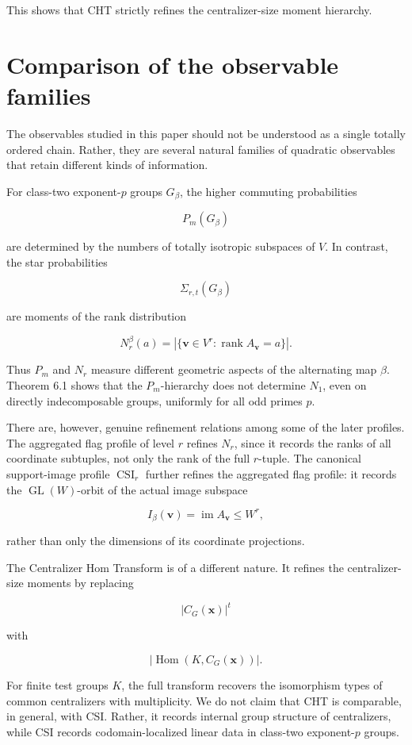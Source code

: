 \documentclass[11pt]{article}
\begin{document}
This shows that CHT strictly refines the centralizer-size moment hierarchy.

\section{Comparison of the observable families}

The observables studied in this paper should not be understood as a single totally ordered chain. Rather, they are several natural families of quadratic observables that retain different kinds of information.

For class-two exponent-$p$ groups $G_\beta$, the higher commuting probabilities

\[
P_m(G_\beta)
\]

are determined by the numbers of totally isotropic subspaces of $V$. In contrast, the star probabilities

\[
\Sigma_{r,t}(G_\beta)
\]

are moments of the rank distribution

\[
N_r^\beta(a)
=
|\{\mathbf v\in V^r:\operatorname{rank}A_{\mathbf v}=a\}|.
\]

Thus $P_m$ and $N_r$ measure different geometric aspects of the alternating map $\beta$. Theorem 6.1 shows that the $P_m$-hierarchy does not determine $N_1$, even on directly indecomposable groups, uniformly for all odd primes $p$.

There are, however, genuine refinement relations among some of the later profiles. The aggregated flag profile of level $r$ refines $N_r$, since it records the ranks of all coordinate subtuples, not only the rank of the full $r$-tuple. The canonical support-image profile $\operatorname{CSI}_r$ further refines the aggregated flag profile: it records the $\operatorname{GL}(W)$-orbit of the actual image subspace

\[
I_\beta(\mathbf v)=\operatorname{im}A_{\mathbf v}\le W^r,
\]

rather than only the dimensions of its coordinate projections.

The Centralizer Hom Transform is of a different nature. It refines the centralizer-size moments by replacing

\[
|C_G(\mathbf x)|^t
\]

with

\[
|\operatorname{Hom}(K,C_G(\mathbf x))|.
\]

For finite test groups $K$, the full transform recovers the isomorphism types of common centralizers with multiplicity. We do not claim that CHT is comparable, in general, with CSI. Rather, it records internal group structure of centralizers, while CSI records codomain-localized linear data in class-two exponent-$p$ groups.
\end{document}
